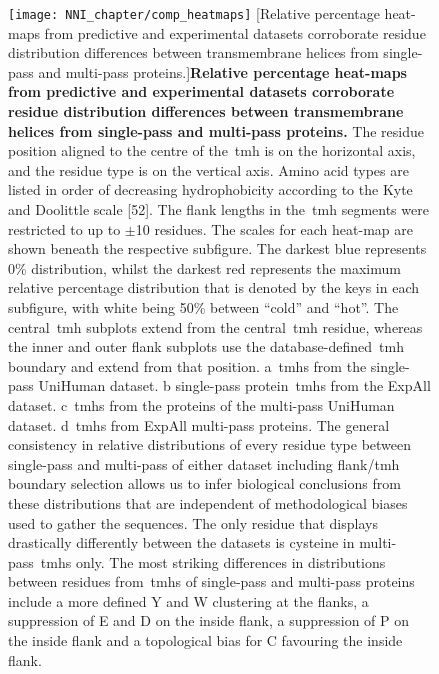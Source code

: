 \begin{figure}[p]
\centering
\texttt{[image: NNI\_chapter/comp\_heatmaps]}
[Relative percentage heat-maps from predictive and experimental datasets corroborate residue distribution differences between transmembrane helices from single\--pass and multi\--pass proteins.]{\textbf{Relative percentage heat-maps from predictive and experimental datasets corroborate residue distribution differences between transmembrane helices from single\--pass and multi\--pass proteins.}
The residue position aligned to the centre of the~\gls{tmh} is on the horizontal axis, and the residue type is on the vertical axis.
Amino acid types are listed in order of decreasing hydrophobicity according to the Kyte and Doolittle scale [52].
The flank lengths in the~\gls{tmh} segments were restricted to up to $\pm$10 residues.
The scales for each heat-map are shown beneath the respective subfigure.
The darkest blue represents 0\% distribution, whilst the darkest red represents the maximum relative percentage distribution that is denoted by the keys in each subfigure, with white being 50\% between ``cold'' and ``hot''.
The central~\gls{tmh} subplots extend from the central~\gls{tmh} residue, whereas the inner and outer flank subplots use the database-defined~\gls{tmh} boundary and extend from that position.
a~\gls{tmh}s from the single\--pass UniHuman dataset.
b single\--pass protein~\gls{tmh}s from the ExpAll dataset.
c~\gls{tmh}s from the proteins of the multi\--pass UniHuman dataset.
d~\gls{tmh}s from ExpAll multi\--pass proteins.
The general consistency in relative distributions of every residue type between single\--pass and multi\--pass of either dataset including flank/\gls{tmh} boundary selection allows us to infer biological conclusions from these distributions that are independent of methodological biases used to gather the sequences.
The only residue that displays drastically differently between the datasets is cysteine in multi\--pass~\gls{tmh}s only.
The most striking differences in distributions between residues from~\gls{tmh}s of single\--pass and multi\--pass proteins include a more defined Y and W clustering at the flanks, a suppression of E and D on the inside flank, a suppression of P on the inside flank and a topological bias for C favouring the inside flank.}

\label{fig:comp_heatmaps}
\end{figure}

